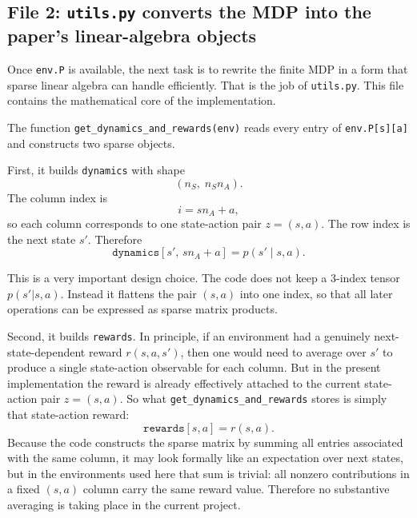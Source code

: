 \documentclass[11pt]{article}
\begin{document}
\subsection*{File 2: \texttt{utils.py} converts the MDP into the paper's linear-algebra objects}

Once \texttt{env.P} is available, the next task is to rewrite the finite MDP in a form that
sparse linear algebra can handle efficiently. That is the job of \texttt{utils.py}. This file
contains the mathematical core of the implementation.

The function \texttt{get\_dynamics\_and\_rewards(env)} reads every entry of
\texttt{env.P[s][a]} and constructs two sparse objects.

First, it builds \texttt{dynamics} with shape
\begin{equation}
    (n_S,\; n_S n_A).
\end{equation}
The column index is
\begin{equation}
    i = s n_A + a,
\end{equation}
so each column corresponds to one state-action pair \(z=(s,a)\). The row index is the next
state \(s'\). Therefore
\begin{equation}
    \texttt{dynamics}[s',\, s n_A + a] = p(s' \mid s,a).
\end{equation}

This is a very important design choice. The code does not keep a 3-index tensor
\(p(s'|s,a)\). Instead it flattens the pair \((s,a)\) into one index, so that all later
operations can be expressed as sparse matrix products.

Second, it builds \texttt{rewards}. In principle, if an environment had a genuinely
next-state-dependent reward \(r(s,a,s')\), then one would need to average over \(s'\) to
produce a single state-action observable for each column. But in the present implementation the
reward is already effectively attached to the current state-action pair \(z=(s,a)\). So what
\texttt{get\_dynamics\_and\_rewards} stores is simply that state-action reward:
\begin{equation}
    \texttt{rewards}[s,a]=r(s,a).
\end{equation}
Because the code constructs the sparse matrix by summing all entries associated with the same
column, it may look formally like an expectation over next states, but in the environments used
here that sum is trivial: all nonzero contributions in a fixed \((s,a)\) column carry the same
reward value. Therefore no substantive averaging is taking place in the current project.
\end{document}
